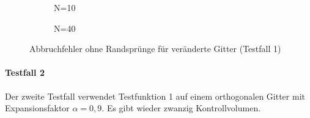 \begin{figure}[ht]
\centering
   \begin{subfigure}{0.49\linewidth} \centering
  \caption{N=10}\label{fig:figA}
   \end{subfigure}
   \begin{subfigure}{0.49\linewidth} \centering
  \caption{N=40}\label{fig:figB}
   \end{subfigure}
   \caption{Abbruchfehler ohne Randsprünge für veränderte Gitter (Testfall 1)}
\end{figure}

\vspace{2cm}


\paragraph{Testfall 2}
\noindent
Der zweite Testfall verwendet Testfunktion 1 auf einem orthogonalen Gitter mit
Expansionsfaktor $\alpha=0,9$. Es gibt wieder zwanzig Kontrollvolumen.

